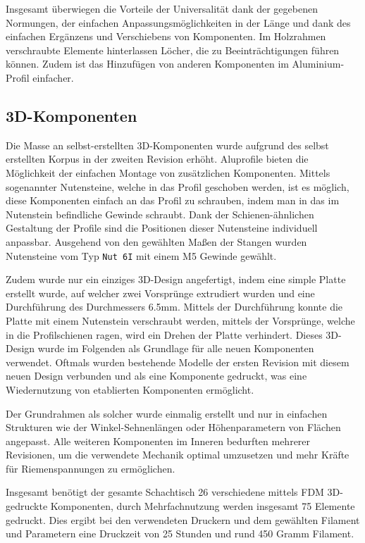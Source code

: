 Insgesamt überwiegen die Vorteile der Universalität dank der gegebenen
Normungen, der einfachen Anpassungsmöglichkeiten in der Länge und dank
des einfachen Ergänzens und Verschiebens von Komponenten. Im Holzrahmen
verschraubte Elemente hinterlassen Löcher, die zu Beeinträchtigungen
führen können. Zudem ist das Hinzufügen von anderen Komponenten im
Aluminium-Profil einfacher.

\hypertarget{d-komponenten}{%
\subsection{3D-Komponenten}\label{d-komponenten}}

Die Masse an selbst-erstellten 3D-Komponenten wurde aufgrund des selbst
erstellten Korpus in der zweiten Revision erhöht. Aluprofile bieten die
Möglichkeit der einfachen Montage von zusätzlichen Komponenten. Mittels
sogenannter Nutensteine, welche in das Profil geschoben werden, ist es
möglich, diese Komponenten einfach an das Profil zu schrauben, indem man
in das im Nutenstein befindliche Gewinde schraubt. Dank der
Schienen-ähnlichen Gestaltung der Profile sind die Positionen dieser
Nutensteine individuell anpassbar. Ausgehend von den gewählten Maßen der
Stangen wurden Nutensteine vom Typ \passthrough{\lstinline!Nut 6I!} mit
einem M5 Gewinde gewählt.

Zudem wurde nur ein einziges 3D-Design angefertigt, indem eine simple
Platte erstellt wurde, auf welcher zwei Vorsprünge extrudiert wurden und
eine Durchführung des Durchmessers 6.5mm. Mittels der Durchführung
konnte die Platte mit einem Nutenstein verschraubt werden, mittels der
Vorsprünge, welche in die Profilschienen ragen, wird ein Drehen der
Platte verhindert. Dieses 3D-Design wurde im Folgenden als Grundlage für
alle neuen Komponenten verwendet. Oftmals wurden bestehende Modelle der
ersten Revision mit diesem neuen Design verbunden und als eine
Komponente gedruckt, was eine Wiedernutzung von etablierten Komponenten
ermöglicht.

Der Grundrahmen als solcher wurde einmalig erstellt und nur in einfachen
Strukturen wie der Winkel-Sehnenlängen oder Höhenparametern von Flächen
angepasst. Alle weiteren Komponenten im Inneren bedurften mehrerer
Revisionen, um die verwendete Mechanik optimal umzusetzen und mehr
Kräfte für Riemenspannungen zu ermöglichen.

Insgesamt benötigt der gesamte Schachtisch 26 verschiedene mittels FDM
3D-gedruckte Komponenten, durch Mehrfachnutzung werden insgesamt 75
Elemente gedruckt. Dies ergibt bei den verwendeten Druckern und dem
gewählten Filament und Parametern eine Druckzeit von 25 Stunden und rund
450 Gramm Filament.

